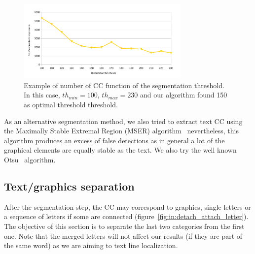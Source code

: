 % 
	\begin{figure}[h!]	%
	  \centering
		\includegraphics[trim= 0px 0px 0px 0px, clip, width=0.75\textwidth]{CC_graph_source_one_curve.pdf}
		\caption[Evolution of the number of connected-component]{Example of number of CC function of the segmentation threshold. In this case, $th_{min}=100$, $th_{max}=230$ and our algorithm found 150 as optimal threshold threshold.}
		\label{fig:in:CC_graph}
	\end{figure}

As an alternative segmentation method, we also tried to extract text CC using the Maximally Stable Extremal Region (MSER) algorithm~\cite{Matas02} nevertheless, this algorithm produces an excess of false detections as in general a lot of the graphical elements are equally stable as the text. We also try the well known Otsu~\cite{otsu79} algorithm. %


\subsection{Text/graphics separation}
\label{sec:te:textgraphicseparation}
After the segmentation step, the CC may correspond to graphics, single letters or a sequence of letters if some are connected (figure~\ref{fig:in:detach_attach_letter}). The objective of this section is to separate the last two categories from the first one. Note that the merged letters will not affect our results (if they are part of the same word) as we are aiming to text line localization.


